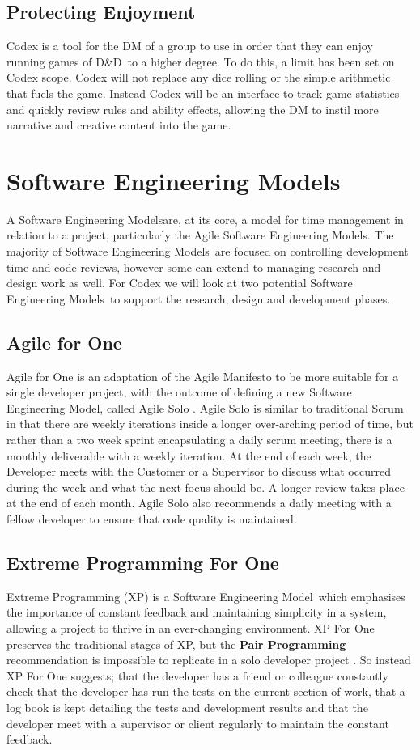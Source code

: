 \documentclass[review]{cmpreport}
\newcommand{\dnd}{D\&D}
\newcommand{\sem}{Software Engineering Model}
\newcommand{\sems}{Software Engineering Models}
\begin{document}
	\subsection{Protecting Enjoyment}
	Codex is a tool for the DM of a group to use in order that they can enjoy running games of \dnd \ to a higher degree. To do this, a limit has been set on Codex scope. Codex will not replace any dice rolling or the simple arithmetic that fuels the game. Instead Codex will be an interface to track game statistics and quickly review rules and ability effects,  allowing the DM to instil more narrative and creative content into the game. 
	
	\section{Software Engineering Models}
	A \sems are, at its core, a model for time management in relation to a project, particularly the Agile \sems . The majority of \sems \ are focused on controlling development time and code reviews, however some can extend to managing research and design work as well. For Codex we will look at two potential \sems \ to support the research, design and development phases. 
	 
	\subsection{Agile for One}
	Agile for One is an adaptation of the Agile Manifesto to be more suitable for a single developer project, with the outcome of defining a new \sem , called Agile Solo \cite{AgileSolo}. Agile Solo is similar to traditional Scrum in that there are weekly iterations inside a longer over-arching period of time, but rather than a two week sprint encapsulating a daily scrum meeting, there is a monthly deliverable with a weekly iteration. At the end of each week, the Developer meets with the Customer or a Supervisor to discuss what occurred during the week and what the next focus should be. A longer review takes place at the end of each month. Agile Solo also recommends a daily meeting with a fellow developer to ensure that code quality is maintained. 
	
	\subsection{Extreme Programming For One}
	Extreme Programming (XP) is a \sem \ which emphasises the importance of constant feedback and maintaining simplicity in a system, allowing a project to thrive in an ever-changing environment. XP For One preserves the traditional stages of XP, but the \textbf{Pair Programming} recommendation is impossible to replicate in a solo developer project \cite{SoloXP}. So instead XP For One suggests; that the developer has a friend or colleague constantly check that the developer has run the tests on the current section of work, that a log book is kept detailing the tests and development results and that the developer meet with a supervisor or client regularly to maintain the constant feedback. 
	
\end{document}
